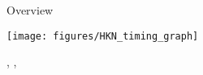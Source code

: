 \documentclass[10pt,english,slidetop,compress,
              blue,mathserif,color=option]{beamer}
\theoremstyle{plain}
\theoremstyle{definition}
\begin{document}
  \begin{frame}{Overview}






    \begin{center}
      \texttt{[image: figures/HKN\_timing\_graph]}
    \end{center}
  \hfill {\smaller\color{gray} \citet{Lagos2005}, \citet{Berentsen2007}, \citet{BurdettJudd1983}}


\end{frame}
\end{document}
